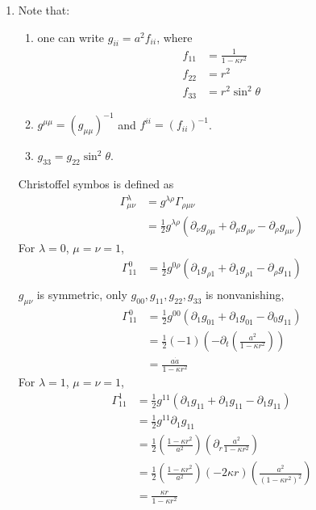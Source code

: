 \begin{enumerate}[label=(\alph*)]
	\item  
	Note that:
	\begin{enumerate} [label=(\roman*)]
	\item one can write $g_{ii} = a^2 f_{ii}$, where
		\begin{align*}
		f_{11} &= \frac{1}{1-\kappa r^2} \\
		f_{22} &= r^2 \\
		f_{33} &= r^2 \sin^2{\theta} 
		\end{align*}		
	\item $g^{\mu\mu}=(g_{\mu\mu})^{-1}$ and $f^{ii}=(f_{ii})^{-1}$. 
	\item $g_{33}=g_{22}\sin^2{\theta}$.
	\end{enumerate}
   Christoffel symbos is defined as 
		\begin{align*}
		\Gamma^\lambda_{\mu\nu}  & = g^{\lambda\rho}\Gamma_{\rho\mu\nu} \\
					    & = \frac{1}{2} g^{\lambda\rho} ( \partial_\nu g_{\rho\mu} + \partial_\mu g_{\rho\nu} - \partial_\rho g_{\mu\nu} ) 
		\end{align*}
	For $\lambda=0$, $\mu=\nu=1$,
		\begin{align*}
		\Gamma^0_{11}  & = \frac{1}{2} g^{0\rho} ( \partial_1 g_{\rho1} + \partial_1 g_{\rho1} - \partial_\rho g_{11} ) 	\\
		\end{align*}
	$g_{\mu\nu}$ is symmetric, only $g_{00},g_{11},g_{22},g_{33}$ is nonvanishing,
		\begin{align*}
		\Gamma^0_{11}  & = \frac{1}{2} g^{00} ( \partial_1 g_{01} + \partial_1 g_{01} - \partial_0 g_{11} )\\
	& =  	\frac{1}{2} (-1) (- \partial_t (\frac{a^2}{1-\kappa r^2})) \\
	& = \frac{a \dot{a}}{1-\kappa r^2}
		\end{align*}
	For $\lambda=1$, $\mu=\nu=1$,
		\begin{align*}
		\Gamma^1_{11}  	& = \frac{1}{2} g^{11} ( \partial_1 g_{11} + \partial_1 g_{11} - \partial_1 g_{11} ) 	\\
						& = \frac{1}{2} g^{11} \partial_1 g_{11} \\
 						& = \frac{1}{2} ( \frac{1-\kappa r^2}{a^2} )(\partial_r  \frac{a^2}{1-\kappa r^2}) \\
 						& = \frac{1}{2} ( \frac{1-\kappa r^2}{a^2} )(-2\kappa r)(\frac{a^2}{(1-\kappa r^2)^2})\\
 						& = \frac{\kappa r}{1-\kappa r^2}
		\end{align*}

\end{enumerate}
